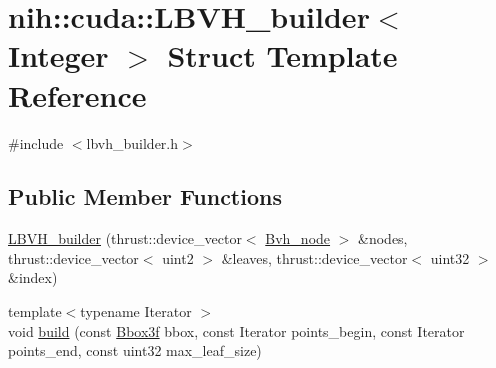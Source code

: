 \hypertarget{structnih_1_1cuda_1_1_l_b_v_h__builder}{
\section{nih\-:\-:cuda\-:\-:\-L\-B\-V\-H\-\_\-builder$<$ \-Integer $>$ \-Struct \-Template \-Reference}
\label{structnih_1_1cuda_1_1_l_b_v_h__builder}
}


{\ttfamily \#include $<$lbvh\-\_\-builder.\-h$>$}

\subsection*{\-Public \-Member \-Functions}
\begin{DoxyCompactItemize}
\item 
\hyperlink{structnih_1_1cuda_1_1_l_b_v_h__builder_a741aaa3327c755146ab412eb87431c0e}{\-L\-B\-V\-H\-\_\-builder} (thrust\-::device\-\_\-vector$<$ \hyperlink{structnih_1_1_bvh__node}{\-Bvh\-\_\-node} $>$ \&nodes, thrust\-::device\-\_\-vector$<$ uint2 $>$ \&leaves, thrust\-::device\-\_\-vector$<$ uint32 $>$ \&index)
\item 
{\footnotesize template$<$typename Iterator $>$ }\\void \hyperlink{structnih_1_1cuda_1_1_l_b_v_h__builder_abb1ce022488c550e59cc87cd3d7ff2db}{build} (const \hyperlink{structnih_1_1_bbox}{\-Bbox3f} bbox, const \-Iterator points\-\_\-begin, const \-Iterator points\-\_\-end, const uint32 max\-\_\-leaf\-\_\-size)
\end{DoxyCompactItemize}
